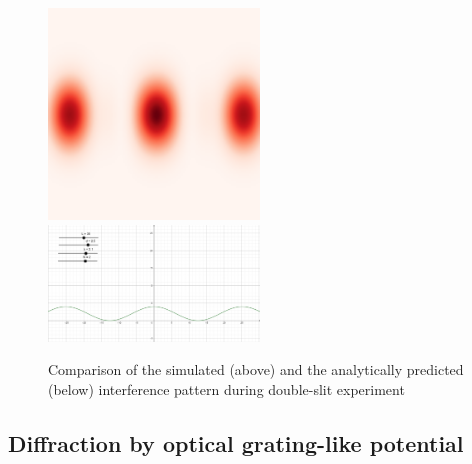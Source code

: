 \begin{figure}
	\begin{center}
		\includegraphics[width=0.5\textwidth]{figures/double_slit_interference.png}
		\includegraphics[width=0.5\textwidth]{figures/validation_of_double_slit.png}
		\caption{Comparison of the simulated (above) and the analytically predicted (below) interference pattern during double-slit experiment}
		\label{fig:double_slit_interference}
	\end{center}
\end{figure}

\subsection{Diffraction by optical grating-like potential}


